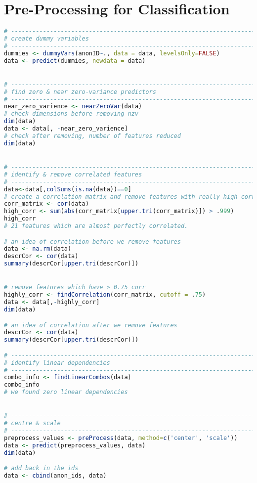 \section{Pre-Processing for Classification}
\begin{lstlisting}[language=R]
# ------------------------------------------------------------------------------
# create dummy variables
# ------------------------------------------------------------------------------
dummies <- dummyVars(anonID~., data = data, levelsOnly=FALSE)
data <- predict(dummies, newdata = data)


# ------------------------------------------------------------------------------
# find zero & near zero-variance predictors
# ------------------------------------------------------------------------------
near_zero_varience <- nearZeroVar(data)
# check dimensions before removing nzv
dim(data)
data <- data[, -near_zero_varience]
# check after removing, number of features reduced
dim(data)


# ------------------------------------------------------------------------------
# identify & remove correlated features
# ------------------------------------------------------------------------------
data<-data[,colSums(is.na(data))==0]
# create a correlation matrix and remove features with really high correlation
corr_matrix <- cor(data)
high_corr <- sum(abs(corr_matrix[upper.tri(corr_matrix)]) > .999)
high_corr
# 21 features which are almost perfectly correlated.

# an idea of correlation before we remove features
data <- na.rm(data)
descrCor <- cor(data)
summary(descrCor[upper.tri(descrCor)])


# remove features which have > 0.75 corr
highly_corr <- findCorrelation(corr_matrix, cutoff = .75)
data <- data[,-highly_corr]
dim(data)

# an idea of correlation after we remove features
descrCor <- cor(data)
summary(descrCor[upper.tri(descrCor)])

# ------------------------------------------------------------------------------
# identify linear dependencies
# ------------------------------------------------------------------------------
combo_info <- findLinearCombos(data)
combo_info
# we found zero linear dependencies


# ------------------------------------------------------------------------------
# centre & scale
# ------------------------------------------------------------------------------
preprocess_values <- preProcess(data, method=c('center', 'scale'))
data <- predict(preprocess_values, data)
dim(data)

# add back in the ids
data <- cbind(anon_ids, data)
\end{lstlisting}
    

